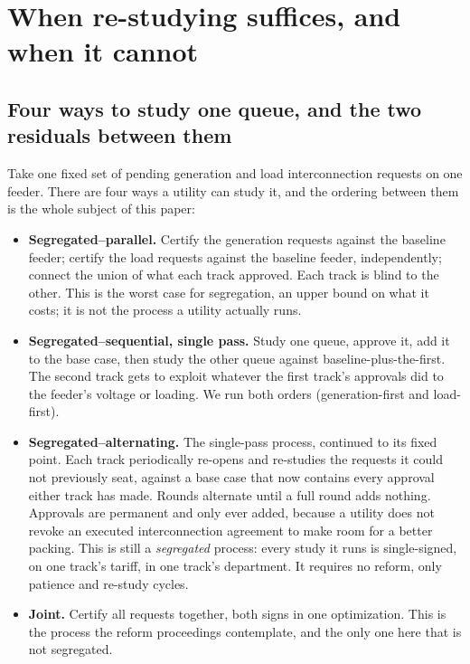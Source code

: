 \documentclass[review,authoryear,12pt]{elsarticle}
\begin{document}
\section{When re-studying suffices, and when it cannot}
\label{sec:theory}

\subsection{Four ways to study one queue, and the two residuals between them}
\label{sec:three-ways}

Take one fixed set of pending generation and load interconnection requests
on one feeder. There are four ways a utility can study it, and the ordering
between them is the whole subject of this paper:

\begin{itemize}
  \item \textbf{Segregated--parallel.} Certify the generation requests
    against the baseline feeder; certify the load requests against the
    baseline feeder, independently; connect the union of what each track
    approved. Each track is blind to the other. This is the worst case for
    segregation, an upper bound on what it costs; it is not the process a
    utility actually runs.
  \item \textbf{Segregated--sequential, single pass.} Study one queue,
    approve it, add it to the base case, then study the other queue against
    baseline-plus-the-first. The second track gets to exploit whatever the
    first track's approvals did to the feeder's voltage or loading. We run
    both orders (generation-first and load-first).
  \item \textbf{Segregated--alternating.} The single-pass process, continued
    to its fixed point. Each track periodically re-opens and re-studies the
    requests it could not previously seat, against a base case that now
    contains every approval either track has made. Rounds alternate until a
    full round adds nothing. Approvals are permanent and only ever added,
    because a utility does not revoke an executed interconnection agreement
    to make room for a better packing. This is still a
    \emph{segregated} process: every study it runs is single-signed, on one track's
    tariff, in one track's department. It requires no reform, only patience
    and re-study cycles.
  \item \textbf{Joint.} Certify all requests together, both signs in one
    optimization. This is the process the reform proceedings contemplate, and
    the only one here that is not segregated.
\end{itemize}
\end{document}
